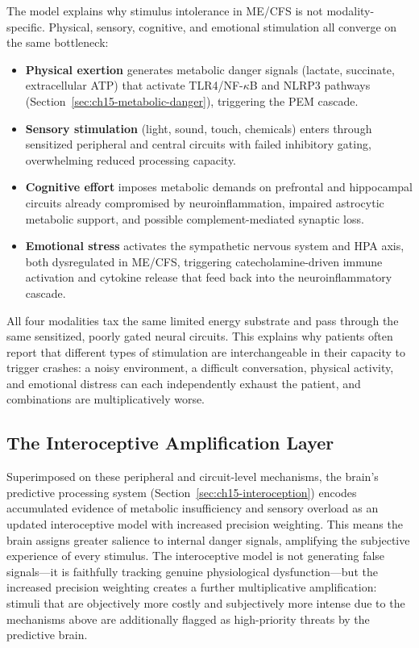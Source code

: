 The model explains why stimulus intolerance in ME/CFS is not modality-specific. Physical, sensory, cognitive, and emotional stimulation all converge on the same bottleneck:

\begin{itemize}
  \item \textbf{Physical exertion} generates metabolic danger signals (lactate, succinate, extracellular ATP) that activate TLR4/NF-$\kappa$B and NLRP3 pathways (Section~\ref{sec:ch15-metabolic-danger}), triggering the PEM cascade.
  \item \textbf{Sensory stimulation} (light, sound, touch, chemicals) enters through sensitized peripheral and central circuits with failed inhibitory gating, overwhelming reduced processing capacity.
  \item \textbf{Cognitive effort} imposes metabolic demands on prefrontal and hippocampal circuits already compromised by neuroinflammation, impaired astrocytic metabolic support, and possible complement-mediated synaptic loss.
  \item \textbf{Emotional stress} activates the sympathetic nervous system and HPA axis, both dysregulated in ME/CFS, triggering catecholamine-driven immune activation and cytokine release that feed back into the neuroinflammatory cascade.
\end{itemize}

All four modalities tax the same limited energy substrate and pass through the same sensitized, poorly gated neural circuits. This explains why patients often report that different types of stimulation are interchangeable in their capacity to trigger crashes: a noisy environment, a difficult conversation, physical activity, and emotional distress can each independently exhaust the patient, and combinations are multiplicatively worse.

\subsection{The Interoceptive Amplification Layer}

Superimposed on these peripheral and circuit-level mechanisms, the brain's predictive processing system (Section~\ref{sec:ch15-interoception}) encodes accumulated evidence of metabolic insufficiency and sensory overload as an updated interoceptive model with increased precision weighting. This means the brain assigns greater salience to internal danger signals, amplifying the subjective experience of every stimulus. The interoceptive model is not generating false signals---it is faithfully tracking genuine physiological dysfunction---but the increased precision weighting creates a further multiplicative amplification: stimuli that are objectively more costly and subjectively more intense due to the mechanisms above are additionally flagged as high-priority threats by the predictive brain.

